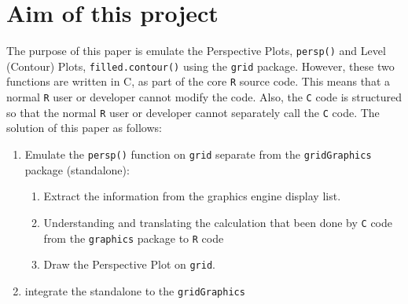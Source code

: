\documentclass[paper=a4, fontsize=11pt]{report}
\begin{document}
\section{Aim of this project}
The purpose of this paper is emulate the Perspective Plots, \texttt{persp()} and Level (Contour) Plots, \texttt{filled.contour()} using the \texttt{grid} package. However, these two functions are written in C, as part of the core \texttt{R} source code. This means that a normal \texttt{R} user or developer cannot modify the code. Also, the \texttt{C} code is structured so that the normal \texttt{R} user or developer cannot separately call the \texttt{C} code. The solution of this paper as follows: 
\newpage
\begin{enumerate}
  \item Emulate the \texttt{persp()} function on \texttt{grid} separate from the \texttt{gridGraphics} package (standalone):
    \begin{enumerate}
      \item Extract the information from the graphics engine display list.
      \item Understanding and translating the calculation that been done by \texttt{C} code from the \texttt{graphics} package to \texttt{R} code
      \item Draw the Perspective Plot on \texttt{grid}.
    \end{enumerate}
  \item integrate the standalone to the \texttt{gridGraphics}
\end{enumerate}



\end{document}

